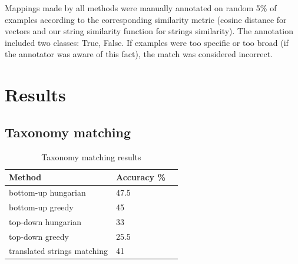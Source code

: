 \documentclass[11pt,a4paper]{article}
\begin{document}
Mappings made by all methods were manually annotated on random 5\% of examples according to the corresponding similarity metric (cosine distance for vectors and our string similarity function for strings similarity). The annotation included two classes: True, False. If examples were too specific or too broad (if the annotator was aware of this fact), the match was considered incorrect.
\section{Results}

\subsection{Taxonomy matching}
	\begin{table}[!htbp]
	\small
	\caption{Taxonomy matching results}
	\label{table-taxonomies-results}		
	\centering
	\begin{tabular}{|l|l|l|}
	\hline
	{Method} & {Accuracy \%} \\ \hline
	bottom-up hungarian & 47.5 \\ \hline
	bottom-up greedy & 45 \\ \hline
	top-down hungarian & 33 \\ \hline
	top-down greedy & 25.5 \\ \hline
	translated strings matching & 41 \\
	\hline
	\end{tabular}
\end{table}
\end{document}
